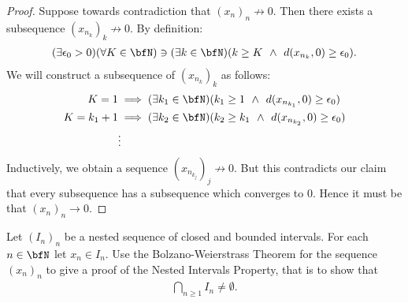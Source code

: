 \documentclass[10pt,twoside,openany]{memoir}
\begin{document}
        \begin{proof}
            Suppose towards contradiction that $(x_n)_n \not\rightarrow 0$. Then there exists a subsequence $(x_{n_k})_k \not\rightarrow 0$. By definition:
                \begin{equation*}
                \begin{split}
                    (\exists \epsilon_0 > 0)(\forall K \in \bfN) \ni (\exists k \in \bfN)(k \geq K \hspace{4pt}\land \hspace{4pt} d(x_{n_k} , 0) \geq \epsilon_0).
                \end{split}
                \end{equation*}
            We will construct a subsequence of $(x_{n_k})_k$ as follows:
                \begin{equation*}
                \begin{split}
                    K = 1 &\implies (\exists k_1 \in \bfN)(k_1 \geq 1 \hspace{4pt}\land\hspace{4pt} d(x_{n_{k_1}}, 0) \geq \epsilon_0) \\
                    K = k_1 + 1 &\implies (\exists k_2 \in \bfN)(k_2 \geq k_1 \hspace{4pt}\land\hspace{4pt} d(x_{n_{k_2}}, 0) \geq \epsilon_0) \\
                    &\vdots 
                \end{split}
                \end{equation*}
            Inductively, we obtain a sequence $(x_{n_{k_j}})_j \not\rightarrow 0$. But this contradicts our claim that every subsequence has a subsequence which converges to $0$. Hence it must be that $(x_n)_n \rightarrow 0$.
        \end{proof}
    \begin{exercise}
        Let $(I_n)_n$ be a nested sequence of closed and bounded intervals. For each $n \in \bfN$ let $x_n \in I_n$. Use the Bolzano-Weierstrass Theorem for the sequence $(x_n)_n$ to give a proof of the Nested Intervals Property, that is to show that
            \begin{equation*}
            \begin{split}
                \bigcap_{n \geq 1}I_n \neq \emptyset.
            \end{split}
            \end{equation*}
    \end{exercise}
\end{document}
